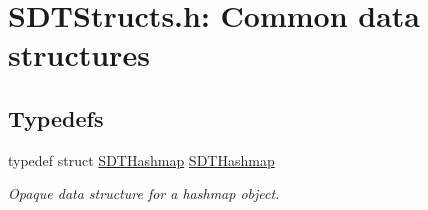 \hypertarget{group__structs}{}\section{S\+D\+T\+Structs.\+h\+: Common data structures}
\label{group__structs}
\subsection*{Typedefs}
\begin{DoxyCompactItemize}
\item 
\hypertarget{group__structs_gaf9aa86ada58e2863bd06d6feb4fdf07c}{}typedef struct \hyperlink{group__structs_gaf9aa86ada58e2863bd06d6feb4fdf07c}{S\+D\+T\+Hashmap} \hyperlink{group__structs_gaf9aa86ada58e2863bd06d6feb4fdf07c}{S\+D\+T\+Hashmap}\label{group__structs_gaf9aa86ada58e2863bd06d6feb4fdf07c}

\begin{DoxyCompactList}\small\item\em Opaque data structure for a hashmap object. \end{DoxyCompactList}\end{DoxyCompactItemize}

